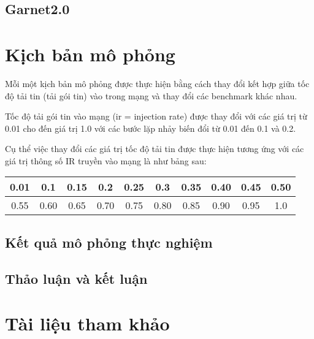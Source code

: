 \documentclass{article}
\begin{document}
\subsection{Garnet2.0}


\section{Kịch bản mô phỏng}

Mỗi một kịch bản mô phỏng được thực hiện bằng cách thay đổi kết hợp giữa tốc độ tải tin (tải gói tin) vào trong mạng và thay đổi các benchmark khác nhau. 

Tốc độ tải gói tin vào mạng (ir = injection rate) được thay đổi với các giá trị từ 0.01 cho đến giá trị 1.0 với các bước lặp nhảy biến đổi từ 0.01 đến 0.1 và 0.2.

Cụ thể việc thay đổi các giá trị tốc độ tải tin được thực hiện tương ứng với các giá trị thông số IR truyền vào mạng là như bảng sau:

\begin{center}
\begin{tabular}{|c|c|c|c|c|c|c|c|c|c|}
	\hline
	0.01 & 0.1  &0.15  &0.2  &0.25  &0.3  &0.35  &0.40  &0.45  &0.50  \\ 
	\hline
	0.55 & 0.60  &0.65  &0.70  &0.75  &0.80  &0.85  &0.90  &0.95  &1.0 \\
	\hline
\end{tabular} 
\end{center}
\subsection{Kết quả mô phỏng thực nghiệm}
\subsection{Thảo luận và kết luận}

\section{Tài liệu tham khảo}


	\newpage
	
	
	
\end{document}
